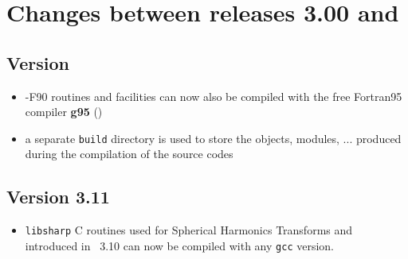 \documentclass[12pt,twoside]{article}
\begin{document}
\newpage

\section[Changes between releases 3.00 and \hpxversion]{%
Changes between releases 3.00 and \hpxversion}
\subsection{Version \hpxversion}
\begin{itemize}
	\item \healpix-F90 routines and facilities can now also be compiled with
the free Fortran95 compiler \textbf{g95}
()
	\item a separate {\tt build} directory is used to store the objects,
modules, ... produced during the compilation of the source codes
\end{itemize}

\subsection{Version 3.11}
\begin{itemize}
	\item {\tt libsharp} C routines used for Spherical Harmonics Transforms 
and introduced in \healpix\ 3.10
can now be compiled with any {\tt gcc} version.
\end{itemize}
\end{document}

